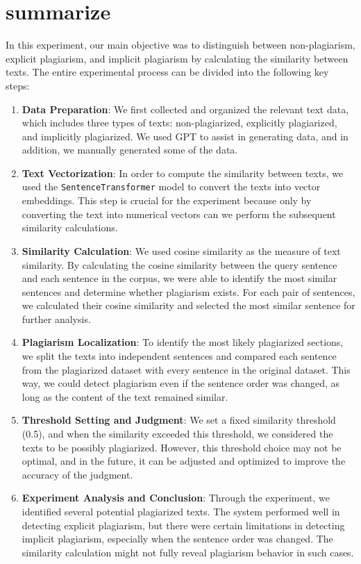 \section{summarize}

In this experiment, our main objective was to distinguish between non-plagiarism, explicit plagiarism, and implicit plagiarism by calculating the similarity between texts. The entire experimental process can be divided into the following key steps:

\begin{enumerate}
    \item \textbf{Data Preparation}: We first collected and organized the relevant text data, which includes three types of texts: non-plagiarized, explicitly plagiarized, and implicitly plagiarized. We used GPT to assist in generating data, and in addition, we manually generated some of the data.
    
    \item \textbf{Text Vectorization}: In order to compute the similarity between texts, we used the \texttt{SentenceTransformer} model to convert the texts into vector embeddings. This step is crucial for the experiment because only by converting the text into numerical vectors can we perform the subsequent similarity calculations.
    
    \item \textbf{Similarity Calculation}: We used cosine similarity as the measure of text similarity. By calculating the cosine similarity between the query sentence and each sentence in the corpus, we were able to identify the most similar sentences and determine whether plagiarism exists. For each pair of sentences, we calculated their cosine similarity and selected the most similar sentence for further analysis.
    
    \item \textbf{Plagiarism Localization}: To identify the most likely plagiarized sections, we split the texts into independent sentences and compared each sentence from the plagiarized dataset with every sentence in the original dataset. This way, we could detect plagiarism even if the sentence order was changed, as long as the content of the text remained similar.
    
    \item \textbf{Threshold Setting and Judgment}: We set a fixed similarity threshold (0.5), and when the similarity exceeded this threshold, we considered the texts to be possibly plagiarized. However, this threshold choice may not be optimal, and in the future, it can be adjusted and optimized to improve the accuracy of the judgment.
    
    \item \textbf{Experiment Analysis and Conclusion}: Through the experiment, we identified several potential plagiarized texts. The system performed well in detecting explicit plagiarism, but there were certain limitations in detecting implicit plagiarism, especially when the sentence order was changed. The similarity calculation might not fully reveal plagiarism behavior in such cases.
\end{enumerate}

